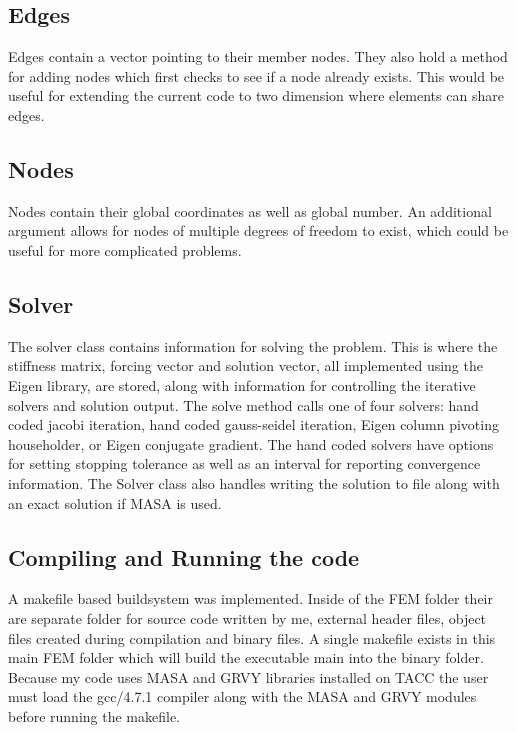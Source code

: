 \documentclass[12pt]{article}
\begin{document}
\subsection*{Edges}

Edges contain a vector pointing to their member nodes.  They also hold a method for adding nodes which first checks to see if a node already exists.  This would be useful for extending the current code to two dimension where elements can share edges.

\subsection*{Nodes}

Nodes contain their global coordinates as well as global number.  An additional argument allows for nodes of multiple degrees of freedom to exist, which could be useful for more complicated problems.

\subsection*{Solver}

The solver class contains information for solving the problem.  This is where the stiffness matrix, forcing vector and solution vector, all implemented using the Eigen library, are stored, along with information for controlling the iterative solvers and solution output.  The solve method calls one of four solvers: hand coded jacobi iteration, hand coded gauss-seidel iteration, Eigen column pivoting householder, or Eigen conjugate gradient.  The hand coded solvers have options for setting stopping tolerance as well as an interval for reporting convergence information.  The Solver class also handles writing the solution to file along with an exact solution if MASA is used.

\subsection*{Compiling and Running the code}
A makefile based buildsystem was implemented.  Inside of the FEM folder their are separate folder for source code written by me, external header files, object files created during compilation and binary files.  A single makefile exists in this main FEM folder which will build the executable main into the binary folder.  Because my code uses MASA and GRVY libraries installed on TACC the user must load the gcc/4.7.1 compiler along with the MASA and GRVY modules before running the makefile.
\end{document}
